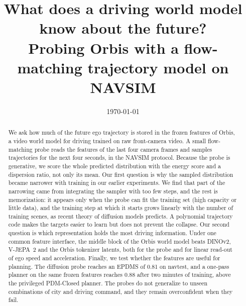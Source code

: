 \documentclass[addpoints]{exam}
\title{What does a driving world model know about the future?\\
\large Probing Orbis with a flow-matching trajectory model on NAVSIM}
\author{\students}
\date{\today}
\begin{document}
    \maketitle

    \begin{abstract}
    We ask how much of the future ego trajectory is stored in the frozen
    features of Orbis, a video world model for driving trained on raw front-camera
    video. A small flow-matching probe reads the features of the last four camera
    frames and samples trajectories for the next four seconds, in the NAVSIM
    protocol. Because the probe is generative, we score the whole predicted
    distribution with the energy score and a dispersion ratio, not only its mean.
    Our first question is why the sampled distribution became narrower with
    training in our earlier experiments. We find that part of the narrowing came
    from integrating the sampler with too few steps, and the rest is
    memorization: it appears only when the probe can fit the training set (high
    capacity or little data), and the training step at which it starts grows
    linearly with the number of training scenes, as recent theory of diffusion
    models predicts. A polynomial trajectory code makes the targets easier to
    learn but does not prevent the collapse. Our second question is which
    representation holds the most driving information. Under one common feature
    interface, the middle block of the Orbis world model beats DINOv2, V-JEPA~2
    and the Orbis tokenizer latents, both for the probe and for linear read-out of
    ego speed and acceleration. Finally, we test whether the features are useful
    for planning. The diffusion probe reaches an EPDMS of 0.81 on navtest, and a
    one-pass planner on the same frozen features reaches 0.88 after two minutes
    of training, above the privileged PDM-Closed planner. The probes do not
    generalize to unseen combinations of city and driving command, and they
    remain overconfident when they fail.
    \end{abstract}

    \tableofcontents
    \clearpage

    
    
    
    
    
    
    
    
\end{document}
